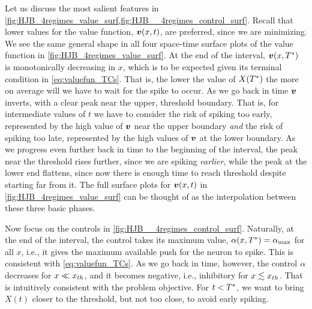 Let us discuss the most salient features in
\cref{fig:HJB_4regimes_value_surf,fig:HJB__4regimes_control_surf}. Recall
that lower values for the value function, ${ \boldsymbol{v} }(x,t)$, are preferred, since we are
minimizing. We see the same general shape in all four space-time surface plots
of the value function in \cref{fig:HJB_4regimes_value_surf}. At the end of the
interval, ${ \boldsymbol{v} }(x,{ T^* })$ is monotonically decreasing in $x$, which is to be expected
given its terminal condition in \cref{eq:valuefun_TCs}. That is, the lower the
value of $X({ T^* })$ the more on average will we have to wait for the spike to
occur.
As we go back in time ${ \boldsymbol{v} }$ inverts, with a clear peak near the upper, threshold
boundary. That is, for intermediate values of $t$ we have to consider the risk
of spiking too early, represented by the high value of ${ \boldsymbol{v} }$ near the upper
boundary {\sl and} the risk of spiking too late, represented by the high values
of ${ \boldsymbol{v} }$ at the lower boundary. As we progress even further back in time to the
beginning of the interval, the peak near the threshold rises further, since we are spiking
{\sl earlier}, while the peak at the lower end flattens, since now there is
enough time to reach threshold despite starting far from it. The full surface
plots for ${ \boldsymbol{v} }(x,t)$ in \cref{fig:HJB_4regimes_value_surf} can be thought of as
the interpolation between these three basic phases.

Now focus on the controls in \cref{fig:HJB__4regimes_control_surf}. Naturally,
at the end of the interval, the control takes its maximum value, $\alpha(x,{ T^* }) =
{ \alpha_{\textrm{max}} }$ for all $x$, i.e., it gives the maximum available push for the neuron to
spike. This is consistent with \cref{eq:valuefun_TCs}. As we go back in time,
however, the control $\alpha$ decreases for $x \ll { x_{th} }$, and it becomes negative,
i.e., inhibitory for $x \lesssim { x_{th} }$. That is intuitively consistent with the
problem objective. For $t<{ T^* }$, we want to bring $X(t)$ closer to the threshold,
but not too close, to avoid early spiking.

